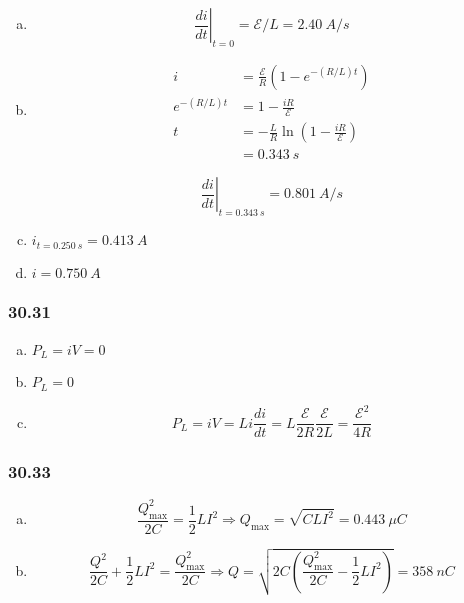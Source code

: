 \documentclass{article}
\begin{document}
\begin{enumerate}[(a)]
  \item \[\left. \frac{di}{dt} \right|_{t = 0} = \mathcal{E} / L = \qty{2.40}{A/s}\]

  \item

        \begin{align*}
          i              & = \frac{\mathcal{E}}{R} (1 - e^{-(R / L) t})                  \\
          e^{-(R / L) t} & = 1 - \frac{i R}{\mathcal{E}}                                 \\
          t              & = -\frac{L}{R} \ln \left( 1 - \frac{i R}{\mathcal{E}} \right) \\
                         & = \qty{0.343}{s}
        \end{align*}

        \[\left. \frac{di}{dt} \right|_{t = \qty{0.343}{s}} = \qty{0.801}{A/s}\]

  \item $i_{t = \qty{0.250}{s}} = \qty{0.413}{A}$

  \item $i = \qty{0.750}{A}$
\end{enumerate}

\subsubsection{30.31}

\begin{enumerate}[(a)]
  \item $P_L = i V = 0$

  \item $P_L = 0$

  \item \[P_L = i V = L i \frac{di}{dt} = L \frac{\mathcal{E}}{2 R} \frac{\mathcal{E}}{2 L} = \frac{\mathcal{E}^2}{4 R}\]
\end{enumerate}

\subsubsection{30.33}

\begin{enumerate}[(a)]
  \item \[\frac{Q_\text{max}^2}{2 C} = \frac{1}{2} L I^2 \Rightarrow Q_\text{max} = \sqrt{C L I^2} = \qty{0.443}{\mu C}\]

  \item \[\frac{Q^2}{2 C} + \frac{1}{2} L I^2 = \frac{Q_\text{max}^2}{2 C} \Rightarrow Q = \sqrt{2 C \left( \frac{Q_\text{max}^2}{2 C} - \frac{1}{2} L I^2 \right)} = \qty{358}{nC}\]
\end{enumerate}
\end{document}

